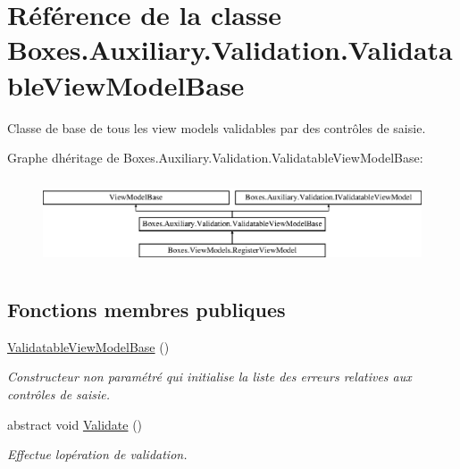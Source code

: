 \hypertarget{class_boxes_1_1_auxiliary_1_1_validation_1_1_validatable_view_model_base}{}\section{Référence de la classe Boxes.\+Auxiliary.\+Validation.\+Validatable\+View\+Model\+Base}
\label{class_boxes_1_1_auxiliary_1_1_validation_1_1_validatable_view_model_base}


Classe de base de tous les view models validables par des contrôles de saisie.  


Graphe d\textquotesingle{}héritage de Boxes.\+Auxiliary.\+Validation.\+Validatable\+View\+Model\+Base\+:\begin{figure}[H]
\begin{center}
\leavevmode
\includegraphics[height=2.576687cm]{class_boxes_1_1_auxiliary_1_1_validation_1_1_validatable_view_model_base}
\end{center}
\end{figure}
\subsection*{Fonctions membres publiques}
\begin{DoxyCompactItemize}
\item 
\hyperlink{class_boxes_1_1_auxiliary_1_1_validation_1_1_validatable_view_model_base_a309c0425670f5b160ebde6fa5286068a}{Validatable\+View\+Model\+Base} ()
\begin{DoxyCompactList}\small\item\em Constructeur non paramétré qui initialise la liste des erreurs relatives aux contrôles de saisie. \end{DoxyCompactList}\item 
abstract void \hyperlink{class_boxes_1_1_auxiliary_1_1_validation_1_1_validatable_view_model_base_a1309e6babfd5e01a5e3a792a5a1b4fa1}{Validate} ()
\begin{DoxyCompactList}\small\item\em Effectue l\textquotesingle{}opération de validation.  \end{DoxyCompactList}\end{DoxyCompactItemize}
